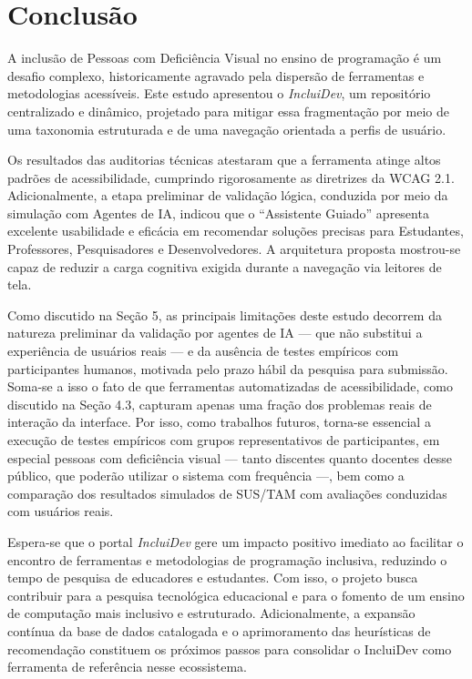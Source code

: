 \documentclass[12pt]{article}
\begin{document}
\section{Conclusão}
A inclusão de Pessoas com Deficiência Visual no ensino de programação é um desafio complexo, historicamente agravado pela dispersão de ferramentas e metodologias acessíveis. Este estudo apresentou o \textit{IncluiDev}, um repositório centralizado e dinâmico, projetado para mitigar essa fragmentação por meio de uma taxonomia estruturada e de uma navegação orientada a perfis de usuário.

Os resultados das auditorias técnicas atestaram que a ferramenta atinge altos padrões de acessibilidade, cumprindo rigorosamente as diretrizes da WCAG 2.1. Adicionalmente, a etapa preliminar de validação lógica, conduzida por meio da simulação com Agentes de IA, indicou que o ``Assistente Guiado'' apresenta excelente usabilidade e eficácia em recomendar soluções precisas para Estudantes, Professores, Pesquisadores e Desenvolvedores. A arquitetura proposta mostrou-se capaz de reduzir a carga cognitiva exigida durante a navegação via leitores de tela.

Como discutido na Seção 5, as principais limitações deste estudo decorrem da natureza preliminar da validação por agentes de IA --- que não substitui a experiência de usuários reais --- e da ausência de testes empíricos com participantes humanos, motivada pelo prazo hábil da pesquisa para submissão. Soma-se a isso o fato de que ferramentas automatizadas de acessibilidade, como discutido na Seção 4.3, capturam apenas uma fração dos problemas reais de interação da interface. Por isso, como trabalhos futuros, torna-se essencial a execução de testes empíricos com grupos representativos de participantes, em especial pessoas com deficiência visual --- tanto discentes quanto docentes desse público, que poderão utilizar o sistema com frequência ---, bem como a comparação dos resultados simulados de SUS/TAM com avaliações conduzidas com usuários reais.

Espera-se que o portal \textit{IncluiDev} gere um impacto positivo imediato ao facilitar o encontro de ferramentas e metodologias de programação inclusiva, reduzindo o tempo de pesquisa de educadores e estudantes. Com isso, o projeto busca contribuir para a pesquisa tecnológica educacional e para o fomento de um ensino de computação mais inclusivo e estruturado. Adicionalmente, a expansão contínua da base de dados catalogada e o aprimoramento das heurísticas de recomendação constituem os próximos passos para consolidar o IncluiDev como ferramenta de referência nesse ecossistema.



\end{document}
